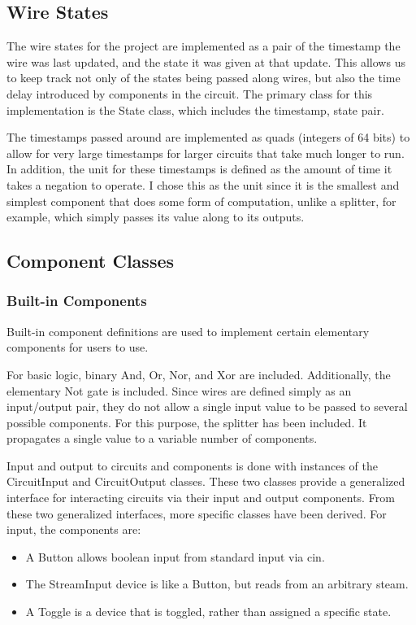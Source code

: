 \documentclass{article}
\begin{document}
\subsection{Wire States}

The wire states for the project are implemented as a pair of the timestamp the wire was last updated, and the state it was given at that update. This allows us to keep track not only of the states being passed along wires, but also the time delay introduced by components in the circuit. The primary class for this implementation is the State class, which includes the timestamp, state pair.

The timestamps passed around are implemented as quads (integers of 64 bits) to allow for very large timestamps for larger circuits that take much longer to run. In addition, the unit for these timestamps is defined as the amount of time it takes a negation to operate. I chose this as the unit since it is the smallest and simplest component that does some form of computation, unlike a splitter, for example, which simply passes its value along to its outputs.

\subsection{Component Classes}

\subsubsection{Built-in Components}

Built-in component definitions are used to implement certain elementary components for users to use.

For basic logic, binary And, Or, Nor, and Xor are included. Additionally,  the elementary Not gate is included. Since wires are defined simply as an input/output pair, they do not allow a single input value to be passed to several possible components. For this purpose, the splitter has been included. It propagates a single value to a variable number of components.

Input and output to circuits and components is done with instances of the CircuitInput and CircuitOutput classes. These two classes provide a generalized interface for interacting circuits via their input and output components. From these two generalized interfaces, more specific classes have been derived. For input, the components are:

\begin{itemize}

\item A Button allows boolean input from standard input via cin.

\item The StreamInput device is like a Button, but reads from an arbitrary steam.

\item A Toggle is a device that is toggled, rather than assigned a specific state.

\end{itemize}
\end{document}

